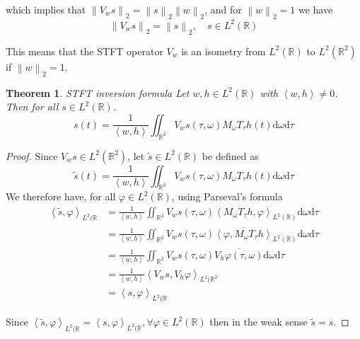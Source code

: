 \documentclass[american,]{article}
\newtheorem{thm}{Theorem}
\theoremstyle{definition}
\theoremstyle{definition}
\theoremstyle{definition}
\theoremstyle{remark}
\begin{document}
which implies that \(\left\lVert V_w s\right\rVert_2 = \left\lVert s\right\rVert_2 \left\lVert w\right\rVert_2\), and for \(\left\lVert w\right\rVert_2=1\) we have
\begin{equation}\label{eq:isometry}
\left\lVert V_w s\right\rVert_2 = \left\lVert s\right\rVert_2,\quad s\in L^2(\mathbb{R})
\end{equation}

This means that the STFT operator \(V_w\) is an isometry from \(L^2(\mathbb{R})\)
to \(L^2(\mathbb{R}^2)\) if \(\left\lVert w\right\rVert_2=1\).

\begin{thm}{STFT inversion formula}
Let $w,h\in L^2(\mathbb{R})$ with $\left\langle w,h\right\rangle\neq0$. Then for all $s\in L^2(\mathbb{R})$.
\begin{equation}
s(t) = \frac{1}{\left\langle w,h\right\rangle} \iint_{\mathbb{R}^2}V_w s(\tau,\omega)M_\omega T_\tau h(t) \mathrm{d}\omega\mathrm{d}\tau
\end{equation}
\end{thm}

\begin{proof}
Since $V_w s\in L^2(\mathbb{R}^2)$, let $\tilde s\in L^2(\mathbb{R})$ be defined as
\begin{equation}
\tilde s(t) = \frac{1}{\left\langle w,h\right\rangle} \iint_{\mathbb{R}^2}V_w s(\tau,\omega)M_\omega T_\tau h(t) \mathrm{d}\omega\mathrm{d}\tau
\end{equation}
We therefore have, for all $\varphi\in L^2(\mathbb{R})$, using Parseval's formula
\begin{align}
\left\langle\tilde s, \varphi\right\rangle_{L^2(\mathbb{R}}
&= \frac{1}{\left\langle w,h\right\rangle} \iint_{\mathbb{R}^2} V_w s(\tau,\omega) \left\langle M_\omega T_\tau h, \varphi\right\rangle_{L^2(\mathbb{R})} \mathrm{d}\omega\mathrm{d}\tau\\
&= \frac{1}{\left\langle w,h\right\rangle} \iint_{\mathbb{R}^2} V_w s(\tau,\omega) \overline{\left\langle\varphi,M_\omega T_\tau h\right\rangle}_{L^2(\mathbb{R})} \mathrm{d}\omega\mathrm{d}\tau\\
&= \frac{1}{\left\langle w,h\right\rangle} \iint_{\mathbb{R}^2} V_w s(\tau,\omega) \overline{V_h \varphi(\tau,\omega)} \mathrm{d}\omega\mathrm{d}\tau\\
&= \frac{1}{\left\langle w,h\right\rangle} \left\langle V_w s, V_h \varphi\right\rangle_{L^2(\mathbb{R}^2}\\
&= \left\langle s, \varphi\right\rangle_{L^2(\mathbb{R}}
\end{align}

Since $\left\langle\tilde s,\varphi\right\rangle_{L^2(\mathbb{R}}=\left\langle s,\varphi\right\rangle_{L^2(\mathbb{R}},\forall\varphi\in L^2(\mathbb{R})$
then in the weak sense $\tilde s = s$.
\end{proof}
\end{document}

